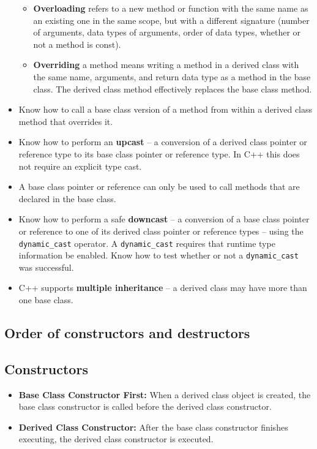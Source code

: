 \documentclass{report}
\begin{document}
\begin{itemize}
            \begin{itemize}
                \item \textbf{Overloading} refers to a new method or function with the same name as an existing one in the same scope, but with a different signature (number of arguments, data types of arguments, order of data types, whether or not a method is const).
                \item \textbf{Overriding} a method means writing a method in a derived class with the same name, arguments, and return data type as a method in the base class. The derived class method effectively replaces the base class method.
            \end{itemize}
        \item Know how to call a base class version of a method from within a derived class method that overrides it.
        \item Know how to perform an \textbf{upcast} – a conversion of a derived class pointer or reference type to its base class pointer or reference type. In C++ this does not require an explicit type cast.
        \item A base class pointer or reference can only be used to call methods that are declared in the base class.
        \item Know how to perform a safe \textbf{downcast} – a conversion of a base class pointer or reference to one of its derived class pointer or reference types – using the \texttt{dynamic\_cast} operator. A \texttt{dynamic\_cast} requires that runtime type information be enabled. Know how to test whether or not a \texttt{dynamic\_cast} was successful.
        \item C++ supports \textbf{multiple inheritance} – a derived class may have more than one base class.
    \end{itemize}

    \bigbreak \noindent 
    \subsection{Order of constructors and destructors}
    \bigbreak \noindent 
    \subsection{Constructors}
    \begin{itemize}
        \item \textbf{Base Class Constructor First:} When a derived class object is created, the base class constructor is called before the derived class constructor.
        \item \textbf{Derived Class Constructor:} After the base class constructor finishes executing, the derived class constructor is executed.
    \end{itemize}
\end{document}

